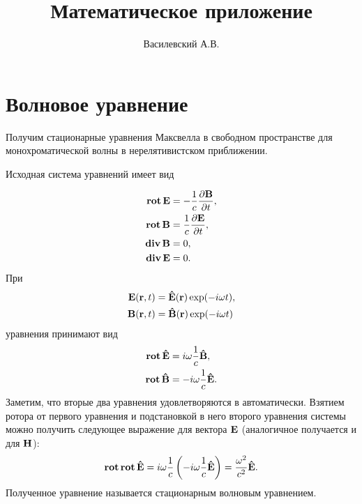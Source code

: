 \documentclass[12pt,a4paper]{article}
\title{Математическое приложение}
\author{Василевский А.В.}
\begin{document}
    \maketitle
    \tableofcontents

    \appendix


    \section{Волновое уравнение}

        Получим стационарные уравнения Максвелла в свободном пространстве для монохроматической волны в нерелятивистском приближении.

        Исходная система уравнений имеет вид

        \begin{equation}\begin{aligned}\label{eq:maxwell_empty_space}
            \operatorname{\mathbf{rot}}\mathbf{E} &= - \frac{1}{c} \frac{\partial \mathbf{B}}{\partial t}, \\
            \operatorname{\mathbf{rot}}\mathbf{B} &= \frac{1}{c} \frac{\partial \mathbf{E}}{\partial t}, \\
            \operatorname{\mathbf{div}}\mathbf{B} &= 0, \\
            \operatorname{\mathbf{div}}\mathbf{E} &= 0.
        \end{aligned}\end{equation}
        При
        \begin{equation}\begin{aligned}
            \mathbf{E}(\mathbf{r}, t) &= \mathbf{\hat{E}}(\mathbf{r}) \exp(- i \omega t), \\
            \mathbf{B}(\mathbf{r}, t) &= \mathbf{\hat{B}}(\mathbf{r}) \exp(- i \omega t)
        \end{aligned}\end{equation}
        уравнения принимают вид
        \begin{equation}\begin{aligned}
            \operatorname{\mathbf{rot}}\mathbf{\hat{E}} &= i \omega \frac{1}{c} \mathbf{\hat{B}}, \\
            \operatorname{\mathbf{rot}}\mathbf{\hat{B}} &= - i \omega \frac{1}{c} \mathbf{\hat{E}}.
        \end{aligned}\end{equation}
        Заметим, что вторые два уравнения удовлетворяются в автоматически. Взятием ротора от первого уравнения и подстановкой в него второго уравнения системы можно получить следующее выражение для вектора $\mathbf{E}$ (аналогичное получается и для $\mathbf{H}$):
        \begin{equation}
            \operatorname{\mathbf{rot}}\operatorname{\mathbf{rot}}{\mathbf{\hat{E}}} = i \omega \frac{1}{c} \left( -i \omega \frac{1}{c} \mathbf{\hat{E}} \right) = \frac{\omega^2}{c^2} \mathbf{\hat{E}}.
        \end{equation}
        Полученное уравнение называется стационарным волновым уравнением.
\end{document}
